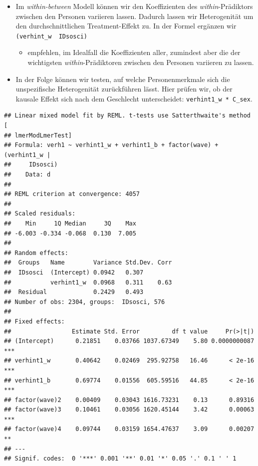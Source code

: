 \documentclass[
]{book}
\newenvironment{Shaded}{\begin{snugshade}}{\end{snugshade}}
\newcommand{\CommentTok}[1]{\textcolor[rgb]{0.56,0.35,0.01}{\textit{#1}}}
\newcommand{\DataTypeTok}[1]{\textcolor[rgb]{0.13,0.29,0.53}{#1}}
\newcommand{\KeywordTok}[1]{\textcolor[rgb]{0.13,0.29,0.53}{\textbf{#1}}}
\newcommand{\NormalTok}[1]{#1}
\newcommand{\OperatorTok}[1]{\textcolor[rgb]{0.81,0.36,0.00}{\textbf{#1}}}
\newcommand{\OtherTok}[1]{\textcolor[rgb]{0.56,0.35,0.01}{#1}}
\newcommand{\StringTok}[1]{\textcolor[rgb]{0.31,0.60,0.02}{#1}}
\providecommand{\tightlist}{%
  \setlength{\itemsep}{0pt}\setlength{\parskip}{0pt}}
\begin{document}
\begin{itemize}
\tightlist
\item
  Im \emph{within-between} Modell können wir den Koeffizienten des \emph{within}-Prädiktors zwischen den Personen variieren lassen. Dadurch lassen wir Heterogenität um den durchschnittlichen Treatment-Effekt zu. In der Formel ergänzen wir \texttt{(verhint\_w\ \textbar{}\ IDsosci)}

  \begin{itemize}
  \tightlist
  \item
    \citet{bellFixedRandomEffects2019} empfehlen, im Idealfall die Koeffizienten aller, zumindest aber die der wichtigsten \emph{within}-Prädiktoren zwischen den Personen variieren zu lassen.
  \end{itemize}
\item
  In der Folge können wir testen, auf welche Personenmerkmale sich die unspezifische Heterogenität zurückführen lässt. Hier prüfen wir, ob der kausale Effekt sich nach dem Geschlecht unterscheidet: \texttt{verhint1\_w\ *\ C\_sex}.
\end{itemize}

\begin{Shaded}
\end{Shaded}

\begin{verbatim}
## Linear mixed model fit by REML. t-tests use Satterthwaite's method [
## lmerModLmerTest]
## Formula: verh1 ~ verhint1_w + verhint1_b + factor(wave) + (verhint1_w |  
##     IDsosci)
##    Data: d
## 
## REML criterion at convergence: 4057
## 
## Scaled residuals: 
##    Min     1Q Median     3Q    Max 
## -6.003 -0.334 -0.068  0.130  7.005 
## 
## Random effects:
##  Groups   Name        Variance Std.Dev. Corr
##  IDsosci  (Intercept) 0.0942   0.307        
##           verhint1_w  0.0968   0.311    0.63
##  Residual             0.2429   0.493        
## Number of obs: 2304, groups:  IDsosci, 576
## 
## Fixed effects:
##                 Estimate Std. Error         df t value     Pr(>|t|)    
## (Intercept)      0.21851    0.03766 1037.67349    5.80 0.0000000087 ***
## verhint1_w       0.40642    0.02469  295.92758   16.46      < 2e-16 ***
## verhint1_b       0.69774    0.01556  605.59516   44.85      < 2e-16 ***
## factor(wave)2    0.00409    0.03043 1616.73231    0.13      0.89316    
## factor(wave)3    0.10461    0.03056 1620.45144    3.42      0.00063 ***
## factor(wave)4    0.09744    0.03159 1654.47637    3.09      0.00207 ** 
## ---
## Signif. codes:  0 '***' 0.001 '**' 0.01 '*' 0.05 '.' 0.1 ' ' 1
\end{verbatim}
\end{document}
